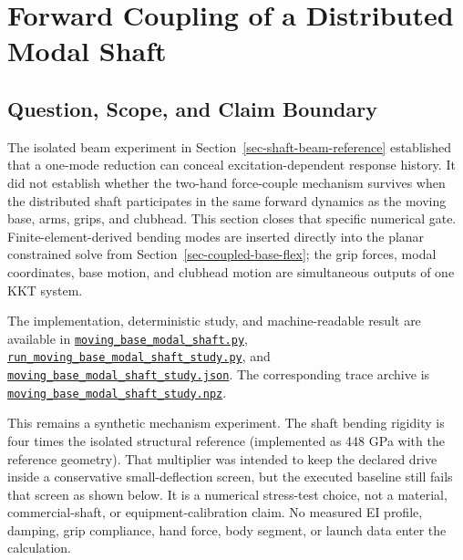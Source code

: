 \documentclass[
  letterpaper,
]{report}
\begin{document}
\chapter{Forward Coupling of a Distributed Modal
Shaft}\label{sec-forward-modal-shaft}

\section{Question, Scope, and Claim
Boundary}\label{question-scope-and-claim-boundary}

The isolated beam experiment in Section~\ref{sec-shaft-beam-reference}
established that a one-mode reduction can conceal excitation-dependent
response history. It did not establish whether the two-hand force-couple
mechanism survives when the distributed shaft participates in the same
forward dynamics as the moving base, arms, grips, and clubhead. This
section closes that specific numerical gate. Finite-element-derived
bending modes are inserted directly into the planar constrained solve
from Section~\ref{sec-coupled-base-flex}; the grip forces, modal
coordinates, base motion, and clubhead motion are simultaneous outputs
of one KKT system.

The implementation, deterministic study, and machine-readable result are
available in
\href{https://github.com/D-sorganization/UpstreamDrift/blob/main/scripts/research/proximal_distal_energy/moving_base_modal_shaft.py}{\texttt{moving\_base\_modal\_shaft.py}},
\href{https://github.com/D-sorganization/UpstreamDrift/blob/main/scripts/research/proximal_distal_energy/run_moving_base_modal_shaft_study.py}{\texttt{run\_moving\_base\_modal\_shaft\_study.py}},
and
\href{https://github.com/D-sorganization/UpstreamDrift/blob/main/docs/research/proximal_distal_energy_transfer/data/moving_base_modal_shaft_study.json}{\texttt{moving\_base\_modal\_shaft\_study.json}}.
The corresponding trace archive is
\href{https://github.com/D-sorganization/UpstreamDrift/blob/main/docs/research/proximal_distal_energy_transfer/data/moving_base_modal_shaft_study.npz}{\texttt{moving\_base\_modal\_shaft\_study.npz}}.

This remains a synthetic mechanism experiment. The shaft bending
rigidity is four times the isolated structural reference (implemented as
448 GPa with the reference geometry). That multiplier was intended to
keep the declared drive inside a conservative small-deflection screen,
but the executed baseline still fails that screen as shown below. It is
a numerical stress-test choice, not a material, commercial-shaft, or
equipment-calibration claim. No measured EI profile, damping, grip
compliance, hand force, body segment, or launch data enter the
calculation.
\end{document}
